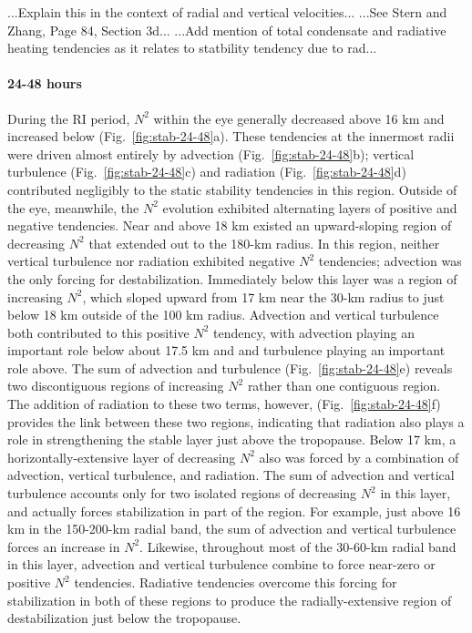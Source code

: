 \documentclass{ametsoc}
\begin{document}
...Explain this in the context of radial and vertical velocities...
...See Stern and Zhang, Page 84, Section 3d...
...Add mention of total condensate and radiative heating tendencies as it relates to statbility tendency due to rad...

\paragraph{24-48 hours}
During the RI period, $N^2$ within the eye generally decreased above 16 km and increased below (Fig.~\ref{fig:stab-24-48}a).
These tendencies at the innermost radii were driven almost entirely by advection (Fig.~\ref{fig:stab-24-48}b); vertical turbulence (Fig.~\ref{fig:stab-24-48}c) and radiation (Fig.~\ref{fig:stab-24-48}d) contributed negligibly to the static stability tendencies in this region.
Outside of the eye, meanwhile, the $N^2$ evolution exhibited alternating layers of positive and negative tendencies.
Near and above 18 km existed an upward-sloping region of decreasing $N^2$ that extended out to the 180-km radius.
In this region, neither vertical turbulence nor radiation exhibited negative $N^2$ tendencies; advection was the only forcing for destabilization.
Immediately below this layer was a region of increasing $N^2$, which sloped upward from 17 km near the 30-km radius to just below 18 km outside of the 100 km radius.
Advection and vertical turbulence both contributed to this positive $N^2$ tendency, with advection playing an important role below about 17.5 km and and turbulence playing an important role above.
The sum of advection and turbulence (Fig.~\ref{fig:stab-24-48}e) reveals two discontiguous regions of increasing $N^2$ rather than one contiguous region.
The addition of radiation to these two terms, however, (Fig.~\ref{fig:stab-24-48}f) provides the link between these two regions, indicating that radiation also plays a role in strengthening the stable layer just above the tropopause.
Below 17 km, a horizontally-extensive layer of decreasing $N^2$ also was forced by a combination of advection, vertical turbulence, and radiation.
The sum of advection and vertical turbulence accounts only for two isolated regions of decreasing $N^2$ in this layer, and actually forces stabilization in part of the region.
For example, just above 16 km in the 150-200-km radial band, the sum of advection and vertical turbulence forces an increase in $N^2$.
Likewise, throughout most of the 30-60-km radial band in this layer, advection and vertical turbulence combine to force near-zero or positive $N^2$ tendencies.
Radiative tendencies overcome this forcing for stabilization in both of these regions to produce the radially-extensive region of destabilization just below the tropopause.
\end{document}
